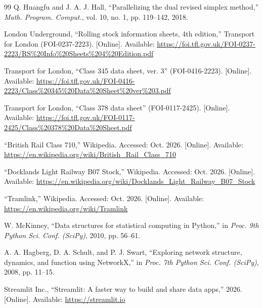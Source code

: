 \documentclass[conference]{IEEEtran}
\begin{document}
\begin{thebibliography}{99}
 Q. Huangfu and J. A. J. Hall, ``Parallelizing the dual revised simplex method,'' \emph{Math. Program. Comput.}, vol. 10, no. 1, pp. 119--142, 2018.

 London Underground, ``Rolling stock information sheets, 4th edition,'' Transport for London (FOI-0237-2223). [Online]. Available: \url{https://foi.tfl.gov.uk/FOI-0237-2223/RS\%20Info\%20Sheets\%204\%20Edition.pdf}

 Transport for London, ``Class 345 data sheet, ver. 3'' (FOI-0416-2223). [Online]. Available: \url{https://foi.tfl.gov.uk/FOI-0416-2223/Class\%20345\%20Data\%20Sheet\%20ver\%203.pdf}

 Transport for London, ``Class 378 data sheet'' (FOI-0117-2425). [Online]. Available: \url{https://foi.tfl.gov.uk/FOI-0117-2425/Class\%20378\%20Data\%20Sheet.pdf}

 ``British Rail Class 710,'' Wikipedia. Accessed: Oct. 2026. [Online]. Available: \url{https://en.wikipedia.org/wiki/British_Rail_Class_710}

 ``Docklands Light Railway B07 Stock,'' Wikipedia. Accessed: Oct. 2026. [Online]. Available: \url{https://en.wikipedia.org/wiki/Docklands_Light_Railway_B07_Stock}

 ``Tramlink,'' Wikipedia. Accessed: Oct. 2026. [Online]. Available: \url{https://en.wikipedia.org/wiki/Tramlink}

 W. McKinney, ``Data structures for statistical computing in Python,'' in \emph{Proc. 9th Python Sci. Conf. (SciPy)}, 2010, pp. 56--61.

 A. A. Hagberg, D. A. Schult, and P. J. Swart, ``Exploring network structure, dynamics, and function using NetworkX,'' in \emph{Proc. 7th Python Sci. Conf. (SciPy)}, 2008, pp. 11--15.

 Streamlit Inc., ``Streamlit: A faster way to build and share data apps,'' 2026. [Online]. Available: \url{https://streamlit.io}
\end{thebibliography}
\end{document}

